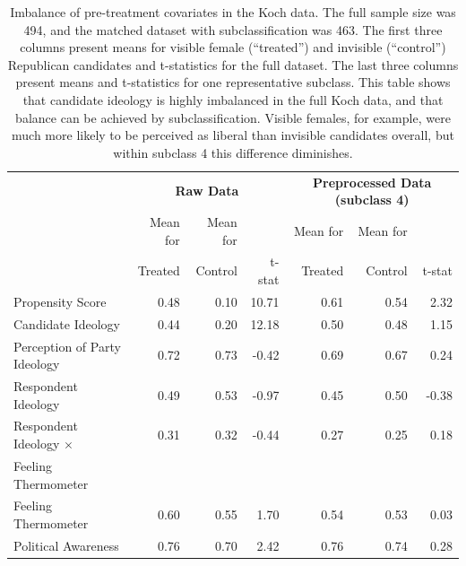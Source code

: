 \documentclass[11pt,titlepage]{article}
\newcommand{\MC}{\multicolumn}
\begin{document}
\begin{table}[t]
  \begin{center}
    \begin{tabular}{lrrrrrr}
      \hline
      & \MC{3}{c}{\bf Raw Data} & \MC{3}{c}{\bf Preprocessed Data
      (subclass 4) }\\
      & Mean for  & Mean for  &    & Mean for  & Mean for \\
      & Treated & Control  & t-stat &    Treated & Control  & t-stat \\
      \hline
      Propensity Score & 0.48 & 0.10 & 10.71 & 0.61 & 0.54 & 2.32 \\
      Candidate Ideology & 0.44 & 0.20 & 12.18 & 0.50 & 0.48 & 1.15 \\
      Perception of Party Ideology & 0.72 & 0.73 & -0.42 & 0.69 & 0.67 & 0.24 \\
      Respondent Ideology & 0.49 & 0.53 & -0.97 & 0.45 & 0.50 & -0.38 \\
      \hspace{0.1in} Respondent Ideology $\times$ & 0.31 & 0.32 & -0.44 & 0.27 &
      0.25 & 0.18 \\
      Feeling Thermometer\\
      Feeling Thermometer & 0.60 & 0.55 & 1.70 & 0.54 & 0.53 & 0.03 \\
      Political Awareness & 0.76 & 0.70 & 2.42 & 0.76 & 0.74 & 0.28 \\
      \hline
    \end{tabular}
    \caption{Imbalance of pre-treatment covariates in the Koch data.
      The full sample size was 494, and the matched dataset with
      subclassification was 463.  The first three columns present
      means for visible female (``treated'') and invisible
      (``control'') Republican candidates and t-statistics for the
      full dataset.  The last three columns present means and
      t-statistics for one representative subclass.  This table shows
      that candidate ideology is highly imbalanced in the full Koch
      data, and that balance can be achieved by subclassification.
      Visible females, for example, were much more likely to be
      perceived as liberal than invisible candidates overall, but
      within subclass 4 this difference diminishes.}
    \label{tb:kochmtest}
  \end{center}
\end{table}
\end{document}
